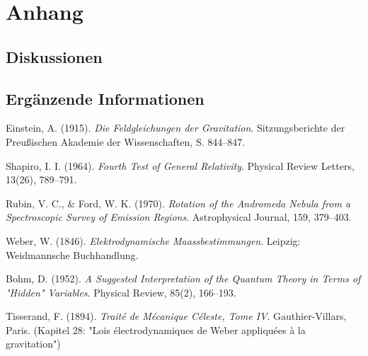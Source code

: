 \documentclass{book}
\numberwithin{equation}{section}
\begin{document}
\part{Anhang}
\chapter{Diskussionen}
\label{chapter:diskussion}



\chapter{Ergänzende Informationen}
\label{chapter:information}









\begin{thebibliography}{9}

Einstein, A. (1915). 
\textit{Die Feldgleichungen der Gravitation}. 
Sitzungsberichte der Preußischen Akademie der Wissenschaften, 
S. 844–847.

Shapiro, I. I. (1964). 
\textit{Fourth Test of General Relativity}. 
Physical Review Letters, 13(26), 789–791.

Rubin, V. C., \& Ford, W. K. (1970). 
\textit{Rotation of the Andromeda Nebula from a Spectroscopic Survey of Emission Regions}. 
Astrophysical Journal, 159, 379–403.

Weber, W. (1846). 
\textit{Elektrodynamische Maassbestimmungen}. 
Leipzig: Weidmannsche Buchhandlung.

Bohm, D. (1952). 
\textit{A Suggested Interpretation of the Quantum Theory in Terms of "Hidden" Variables}. 
Physical Review, 85(2), 166–193.

Tisserand, F. (1894). 
\textit{Traité de Mécanique Céleste, Tome IV}. 
Gauthier-Villars, Paris. 
(Kapitel 28: "Lois électrodynamiques de Weber appliquées à la gravitation")

\end{thebibliography}
\end{document}
